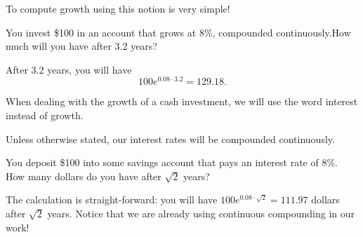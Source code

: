 \documentclass{ximera}
\begin{document}
To compute growth using this notion is very simple!

\begin{example}
You invest \$100 in an account that grows at 8\%, compounded continuously.How much will you have after 3.2 years? 
\end{example}

\begin{solution}
After 3.2 years, you will have
	\begin{equation*}
		100e^{0.08\cdot 3.2}=129.18.
	\end{equation*}
\end{solution}

\begin{remark}
When dealing with the growth of a cash investment, we will use the word interest instead of growth. 
\end{remark}

\begin{ass}
Unless otherwise stated, our interest rates will be compounded continuously.
\end{ass}

\begin{question}
You deposit \$100 into some savings account that pays an interest rate of 8\%. How many dollars do you have after $\sqrt{2}$ years?
	\begin{multipleChoice}
	\end{multipleChoice}
\end{question}

\begin{solution}
The calculation is straight-forward: you will have $100e^{0.08\cdot\sqrt{2}}=111.97$ dollars after $\sqrt{2}$ years. Notice that we are already using continuous compounding in our work!
\end{solution}
\end{document}
